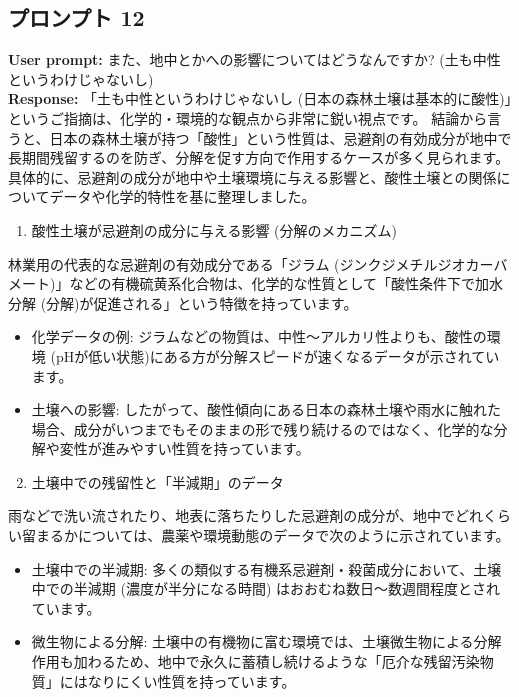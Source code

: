 \documentclass[a4paper, 11pt]{jsarticle}
\begin{document}
\subsection{プロンプト 12}
\noindent\textbf{User prompt:} また、地中とかへの影響についてはどうなんですか? (土も中性というわけじゃないし) \\
\noindent\textbf{Response:} 「土も中性というわけじゃないし (日本の森林土壌は基本的に酸性)」というご指摘は、化学的・環境的な観点から非常に鋭い視点です。
結論から言うと、日本の森林土壌が持つ「酸性」という性質は、忌避剤の有効成分が地中で長期間残留するのを防ぎ、分解を促す方向で作用するケースが多く見られます。
具体的に、忌避剤の成分が地中や土壌環境に与える影響と、酸性土壌との関係についてデータや化学的特性を基に整理しました。
\begin{enumerate}
    \item 酸性土壌が忌避剤の成分に与える影響 (分解のメカニズム)
\end{enumerate}
林業用の代表的な忌避剤の有効成分である「ジラム (ジンクジメチルジオカーバメート)」などの有機硫黄系化合物は、化学的な性質として「酸性条件下で加水分解 (分解)が促進される」という特徴を持っています\cite{ref17,ref21}。
\begin{itemize}
    \item 化学データの例: ジラムなどの物質は、中性〜アルカリ性よりも、酸性の環境 (pHが低い状態)にある方が分解スピードが速くなるデータが示されています\cite{ref21}。
    \item 土壌への影響: したがって、酸性傾向にある日本の森林土壌や雨水に触れた場合、成分がいつまでもそのままの形で残り続けるのではなく、化学的な分解や変性が進みやすい性質を持っています\cite{ref21,ref24}。
\end{itemize}
\begin{enumerate}
    \setcounter{enumi}{1}
    \item 土壌中での残留性と「半減期」のデータ
\end{enumerate}
雨などで洗い流されたり、地表に落ちたりした忌避剤の成分が、地中でどれくらい留まるかについては、農薬や環境動態のデータで次のように示されています。
\begin{itemize}
    \item 土壌中での半減期: 多くの類似する有機系忌避剤・殺菌成分において、土壌中での半減期 (濃度が半分になる時間) はおおむね数日〜数週間程度とされています\cite{ref24}。
    \item 微生物による分解: 土壌中の有機物に富む環境では、土壌微生物による分解作用も加わるため、地中で永久に蓄積し続けるような「厄介な残留汚染物質」にはなりにくい性質を持っています\cite{ref24}。
\end{itemize}
\end{document}
